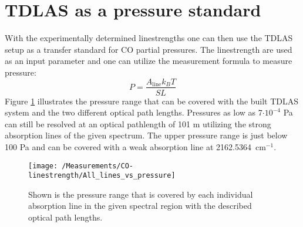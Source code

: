 \section{TDLAS as a pressure standard}
With the experimentally determined linestrengths one can then use the TDLAS setup as a transfer standard for CO partial pressures. The linestrength are used as an input parameter and one can utilize the measurement formula to measure pressure: 
\begin{equation}
P = \frac{A_{\text{line}}  k_B T }{S L}
\end{equation}
Figure \ref{fig:TDLAS_pressure_range} illustrates the pressure range that can be covered with the built TDLAS system and the two different optical path lengths. Pressures as low as 7$\cdot 10^{-4}$ Pa can still be resolved at an optical pathlength of 101 m utilizing the strong absorption lines of the given spectrum. The upper pressure range is just below 100 Pa and can be covered with a weak absorption line at \mbox{2162.5364 cm$^{-1}$}. 
\begin{figure}[H]
	\centering
	\texttt{[image: /Measurements/CO-linestrength/All\_lines\_vs\_pressure]}
	\caption{Shown is the pressure range that is covered by each individual absorption line in the given spectral region with the described optical path lengths.}
	\label{fig:TDLAS_pressure_range}
\end{figure}
